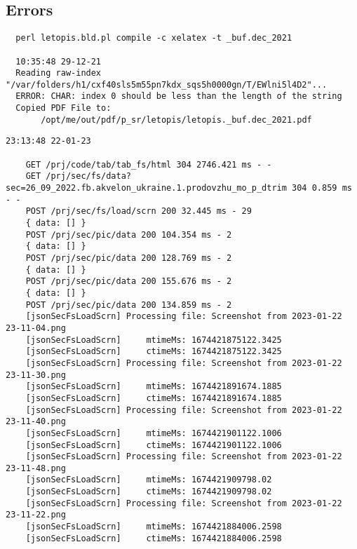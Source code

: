  
 
 
 
 

\subsection{Errors}
\label{sec:build.err}

\begin{Verbatim}
  perl letopis.bld.pl compile -c xelatex -t _buf.dec_2021
  
  10:35:48 29-12-21
  Reading raw-index "/var/folders/h1/cxf40sls5m55pn7kdx_sqs5h0000gn/T/EWlni5l4D2"...
  ERROR: CHAR: index 0 should be less than the length of the string
  Copied PDF File to:
       /opt/me/out/pdf/p_sr/letopis/letopis._buf.dec_2021.pdf
\end{Verbatim}

\begin{Verbatim}
23:13:48 22-01-23

	GET /prj/code/tab/tab_fs/html 304 2746.421 ms - -
	GET /prj/sec/fs/data?sec=26_09_2022.fb.akvelon_ukraine.1.prodovzhu_mo_p_dtrim 304 0.859 ms - -
	POST /prj/sec/fs/load/scrn 200 32.445 ms - 29
	{ data: [] }
	POST /prj/sec/pic/data 200 104.354 ms - 2
	{ data: [] }
	POST /prj/sec/pic/data 200 128.769 ms - 2
	{ data: [] }
	POST /prj/sec/pic/data 200 155.676 ms - 2
	{ data: [] }
	POST /prj/sec/pic/data 200 134.859 ms - 2
	[jsonSecFsLoadScrn] Processing file: Screenshot from 2023-01-22 23-11-04.png
	[jsonSecFsLoadScrn]     mtimeMs: 1674421875122.3425
	[jsonSecFsLoadScrn]     ctimeMs: 1674421875122.3425
	[jsonSecFsLoadScrn] Processing file: Screenshot from 2023-01-22 23-11-30.png
	[jsonSecFsLoadScrn]     mtimeMs: 1674421891674.1885
	[jsonSecFsLoadScrn]     ctimeMs: 1674421891674.1885
	[jsonSecFsLoadScrn] Processing file: Screenshot from 2023-01-22 23-11-40.png
	[jsonSecFsLoadScrn]     mtimeMs: 1674421901122.1006
	[jsonSecFsLoadScrn]     ctimeMs: 1674421901122.1006
	[jsonSecFsLoadScrn] Processing file: Screenshot from 2023-01-22 23-11-48.png
	[jsonSecFsLoadScrn]     mtimeMs: 1674421909798.02
	[jsonSecFsLoadScrn]     ctimeMs: 1674421909798.02
	[jsonSecFsLoadScrn] Processing file: Screenshot from 2023-01-22 23-11-22.png
	[jsonSecFsLoadScrn]     mtimeMs: 1674421884006.2598
	[jsonSecFsLoadScrn]     ctimeMs: 1674421884006.2598
\end{Verbatim}

